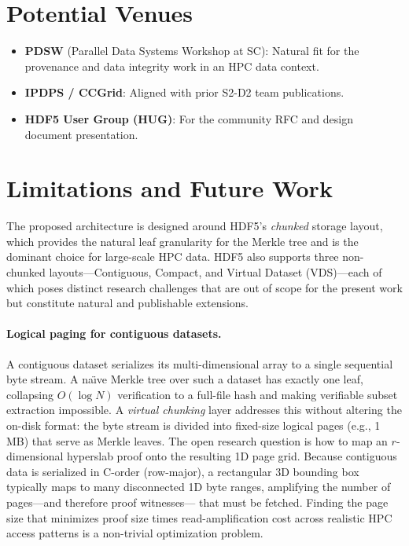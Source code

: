 \documentclass[11pt]{article}
\begin{document}
\section{Potential Venues}
\label{sec:venues}

\begin{itemize}[nosep]
  \item \textbf{PDSW} (Parallel Data Systems Workshop at SC): Natural fit for
    the provenance and data integrity work in an HPC data context.
  \item \textbf{IPDPS / CCGrid}: Aligned with prior S2-D2 team publications.
  \item \textbf{HDF5 User Group (HUG)}: For the community RFC and design
    document presentation.
\end{itemize}

\section{Limitations and Future Work}
\label{sec:limitations}

The proposed architecture is designed around HDF5's \emph{chunked} storage
layout, which provides the natural leaf granularity for the Merkle tree and is
the dominant choice for large-scale HPC data. HDF5 also supports three
non-chunked layouts---Contiguous, Compact, and Virtual Dataset (VDS)---each
of which poses distinct research challenges that are out of scope for the
present work but constitute natural and publishable extensions.

\paragraph{Logical paging for contiguous datasets.}
A contiguous dataset serializes its multi-dimensional array to a single
sequential byte stream. A na\"{\i}ve Merkle tree over such a dataset has exactly
one leaf, collapsing $O(\log N)$ verification to a full-file hash and making
verifiable subset extraction impossible. A \emph{virtual chunking} layer
addresses this without altering the on-disk format: the byte stream is divided
into fixed-size logical pages (e.g., 1\,MB) that serve as Merkle leaves. The
open research question is how to map an $r$-dimensional hyperslab proof onto the
resulting 1D page grid. Because contiguous data is serialized in C-order
(row-major), a rectangular 3D bounding box typically maps to many disconnected
1D byte ranges, amplifying the number of pages---and therefore proof witnesses---
that must be fetched. Finding the page size that minimizes proof size times
read-amplification cost across realistic HPC access patterns is a
non-trivial optimization problem.
\end{document}
